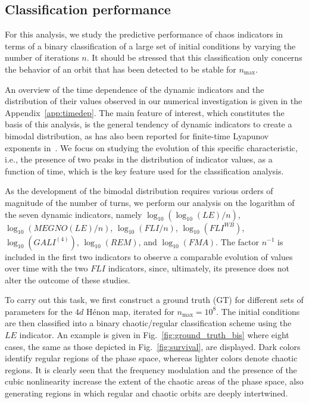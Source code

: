 \subsection{Classification performance}\label{subsec:dyn:classification}

For this analysis, we study the predictive performance of chaos indicators in terms of a binary classification of a large set of initial conditions by varying the number of iterations $n$. It should be stressed that this classification only concerns the behavior of an orbit that has been detected to be stable for $n_\mathrm{max}$.

An overview of the time dependence of the dynamic indicators and the distribution of their values observed in our numerical investigation is given in the Appendix~\ref{app:timedep}. The main feature of interest, which constitutes the basis of this analysis, is the general tendency of dynamic indicators to create a bimodal distribution, as has also been reported for finite-time Lyapunov exponents in~\cite{PhysRevE.60.2761,VALLEJO200326}. We focus on studying the evolution of this specific characteristic, i.e., the presence of two peaks in the distribution of indicator values, as a function of time, which is the key feature used for the classification analysis.

As the development of the bimodal distribution requires various orders of magnitude of the number of turns, we perform our analysis on the logarithm of the seven dynamic indicators, namely $\log_{10}(\log_{10}(LE)/n)$, $\log_{10}(MEGNO(LE)/n)$, $\log_{10}(FLI/n)$, $\log_{10}(FLI^{WB})$, $\log_{10}(GALI^{(4)})$, $\log_{10}(REM)$, and $\log_{10}(FMA)$. The factor $n^{-1}$ is included in the first two indicators to observe a comparable evolution of values over time with the two $FLI$ indicators, since, ultimately, its presence does not alter the outcome of these studies.

To carry out this task, we first construct a ground truth (GT) for different sets of parameters for the $4d$ Hénon map, iterated for $n_\text{max} = 10^8$. The initial conditions are then classified into a binary chaotic/regular classification scheme using the $LE$ indicator. An example is given in Fig.~\ref{fig:ground_truth_bis} where eight cases, the same as those depicted in Fig.~\ref{fig:survival}, are displayed. Dark colors identify regular regions of the phase space, whereas lighter colors denote chaotic regions. It is clearly seen that the frequency modulation and the presence of the cubic nonlinearity increase the extent of the chaotic areas of the phase space, also generating regions in which regular and chaotic orbits are deeply intertwined.  

